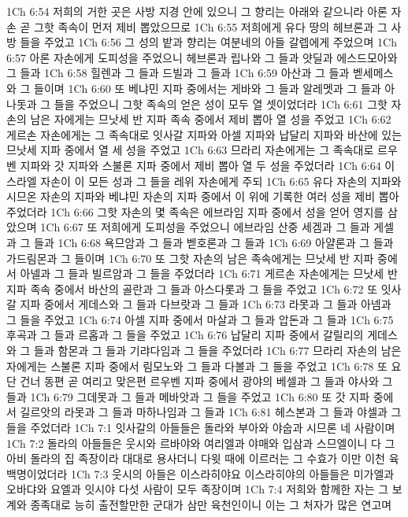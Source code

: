 1Ch 6:54  저희의 거한 곳은 사방 지경 안에 있으니 그 향리는 아래와 같으니라 아론 자손 곧 그핫 족속이 먼저 제비 뽑았으므로
1Ch 6:55  저희에게 유다 땅의 헤브론과 그 사방 들을 주었고
1Ch 6:56  그 성의 밭과 향리는 여분네의 아들 갈렙에게 주었으며
1Ch 6:57  아론 자손에게 도피성을 주었으니 헤브론과 립나와 그 들과 얏딜과 에스드모아와 그 들과
1Ch 6:58  힐렌과 그 들과 드빌과 그 들과
1Ch 6:59  아산과 그 들과 벧세메스와 그 들이며
1Ch 6:60  또 베냐민 지파 중에서는 게바와 그 들과 알레멧과 그 들과 아나돗과 그 들을 주었으니 그핫 족속의 얻은 성이 모두 열 셋이었더라
1Ch 6:61  그핫 자손의 남은 자에게는 므낫세 반 지파 족속 중에서 제비 뽑아 열 성을 주었고
1Ch 6:62  게르손 자손에게는 그 족속대로 잇사갈 지파와 아셀 지파와 납달리 지파와 바산에 있는 므낫세 지파 중에서 열 세 성을 주었고
1Ch 6:63  므라리 자손에게는 그 족속대로 르우벤 지파와 갓 지파와 스불론 지파 중에서 제비 뽑아 열 두 성을 주었더라
1Ch 6:64  이스라엘 자손이 이 모든 성과 그 들을 레위 자손에게 주되
1Ch 6:65  유다 자손의 지파와 시므온 자손의 지파와 베냐민 자손의 지파 중에서 이 위에 기록한 여러 성을 제비 뽑아 주었더라
1Ch 6:66  그핫 자손의 몇 족속은 에브라임 지파 중에서 성을 얻어 영지를 삼았으며
1Ch 6:67  또 저희에게 도피성을 주었으니 에브라임 산중 세겜과 그 들과 게셀과 그 들과
1Ch 6:68  욕므암과 그 들과 벧호론과 그 들과
1Ch 6:69  아얄론과 그 들과 가드림몬과 그 들이며
1Ch 6:70  또 그핫 자손의 남은 족속에게는 므낫세 반 지파 중에서 아넬과 그 들과 빌르암과 그 들을 주었더라
1Ch 6:71  게르손 자손에게는 므낫세 반 지파 족속 중에서 바산의 골란과 그 들과 아스다롯과 그 들을 주었고
1Ch 6:72  또 잇사갈 지파 중에서 게데스와 그 들과 다브랏과 그 들과
1Ch 6:73  라못과 그 들과 아넴과 그 들을 주었고
1Ch 6:74  아셀 지파 중에서 마살과 그 들과 압돈과 그 들과
1Ch 6:75  후곡과 그 들과 르홉과 그 들을 주었고
1Ch 6:76  납달리 지파 중에서 갈릴리의 게데스와 그 들과 함몬과 그 들과 기랴다임과 그 들을 주었더라
1Ch 6:77  므라리 자손의 남은 자에게는 스불론 지파 중에서 림모노와 그 들과 다볼과 그 들을 주었고
1Ch 6:78  또 요단 건너 동편 곧 여리고 맞은편 르우벤 지파 중에서 광야의 베셀과 그 들과 야사와 그 들과
1Ch 6:79  그데못과 그 들과 메바앗과 그 들을 주었고
1Ch 6:80  또 갓 지파 중에서 길르앗의 라못과 그 들과 마하나임과 그 들과
1Ch 6:81  헤스본과 그 들과 야셀과 그 들을 주었더라
1Ch 7:1  잇사갈의 아들들은 돌라와 부아와 야숩과 시므론 네 사람이며
1Ch 7:2  돌라의 아들들은 웃시와 르바야와 여리엘과 야매와 입삼과 스므엘이니 다 그 아비 돌라의 집 족장이라 대대로 용사더니 다윗 때에 이르러는 그 수효가 이만 이천 육백명이었더라
1Ch 7:3  웃시의 아들은 이스라히야요 이스라히야의 아들들은 미가엘과 오바댜와 요엘과 잇시야 다섯 사람이 모두 족장이며
1Ch 7:4  저희와 함께한 자는 그 보계와 종족대로 능히 출전할만한 군대가 삼만 육천인이니 이는 그 처자가 많은 연고며
